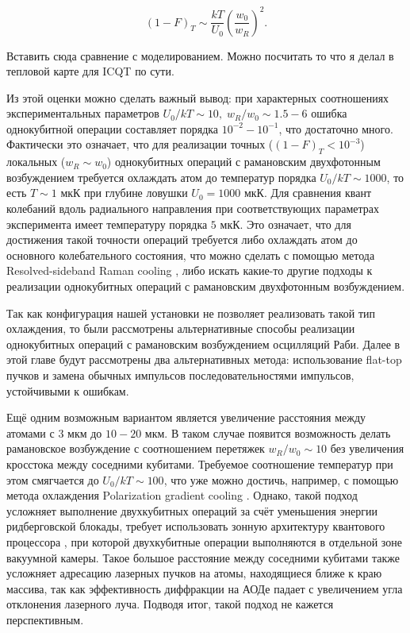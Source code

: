 \begin{equation}
	(1-F)_{T} \sim \frac{kT}{U_0}\left(\frac{w_0}{w_R}\right)^2.
\end{equation}


\begingroup
\color{red}

Вставить сюда сравнение с моделированием. Можно посчитать то что я делал в тепловой карте для ICQT по сути. 
\endgroup

Из этой оценки можно сделать важный вывод: при характерных соотношениях экспериментальных параметров $U_0/kT \sim 10, \; w_R /w_0 \sim 1.5-6$ ошибка однокубитной операции составляет порядка $10^{-2}-10^{-1}$, что достаточно много. Фактически это означает, что для реализации точных ($(1-F)_{T} < 10^{-3}$) локальных ($w_{R} \sim w_0$) однокубитных операций с рамановским двухфотонным возбуждением требуется охлаждать атом до температур порядка $U_0/kT \sim 1000$, то есть $T \sim 1\text{ мкК}$ при глубине ловушки $U_0 = 1000 \text{ мкК}$. Для сравнения квант колебаний вдоль радиального направления при соответствующих параметрах эксперимента имеет температуру порядка $5 \text{ мкК}$. Это означает, что для достижения такой точности операций требуется либо охлаждать атом до основного колебательного состояния, что можно сделать с помощью метода Resolved-sideband Raman cooling \cite{Kaufman_2012,Thompson_2013}, либо искать какие-то другие подходы к реализации однокубитных операций с рамановским двухфотонным возбуждением.

Так как конфигурация нашей установки не позволяет реализовать такой тип охлаждения, то были рассмотрены альтернативные способы реализации однокубитных операций с рамановским возбуждением осцилляций Раби. Далее в этой главе будут рассмотрены два альтернативных метода: использование flat-top пучков и замена обычных импульсов последовательностями импульсов, устойчивыми к ошибкам.

Ещё одним возможным вариантом является увеличение расстояния между атомами с $3\text{ мкм}$ до $10-20\text{ мкм}$. В таком случае появится возможность делать рамановское возбуждение с соотношением перетяжек $w_{R}/w_{0} \sim 10$ без увеличения кросстока между соседними кубитами. Требуемое соотношение температур при этом смягчается до $U_0/kT \sim 100$, что уже можно достичь, например, с помощью метода охлаждения Polarization gradient cooling \cite{PhysRevA.96.033406}. Однако, такой подход усложняет выполнение двухкубитных операций за счёт уменьшения энергии ридберговской блокады, требует использовать зонную архитектуру квантового процессора \cite{Bluvstein:2024aa}, при которой двухкубитные операции выполняются в отдельной зоне вакуумной камеры. Такое большое расстояние между соседними кубитами также усложняет адресацию лазерных пучков на атомы, находящиеся ближе к краю массива, так как эффективность диффракции на АОДе падает с увеличением угла отклонения лазерного луча. Подводя итог, такой подход не кажется перспективным.
   		   


